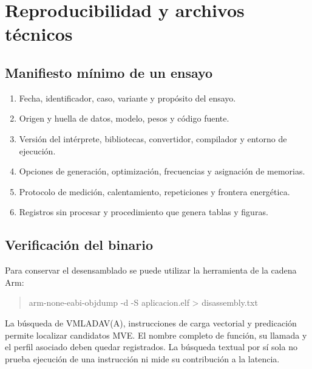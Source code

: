 \chapter{Reproducibilidad y archivos técnicos}
\section{Manifiesto mínimo de un ensayo}
\begin{enumerate}
\item Fecha, identificador, caso, variante y propósito del ensayo.
\item Origen y huella de datos, modelo, pesos y código fuente.
\item Versión del intérprete, bibliotecas, convertidor, compilador y entorno de ejecución.
\item Opciones de generación, optimización, frecuencias y asignación de memorias.
\item Protocolo de medición, calentamiento, repeticiones y frontera energética.
\item Registros sin procesar y procedimiento que genera tablas y figuras.
\end{enumerate}

\section{Verificación del binario}
Para conservar el desensamblado se puede utilizar la herramienta de la cadena Arm:
\begin{quote}\ttfamily\small
arm-none-eabi-objdump -d -S aplicacion.elf > disassembly.txt
\end{quote}
La búsqueda de VMLADAV(A), instrucciones de carga vectorial y predicación permite localizar candidatos MVE. El nombre completo de función, su llamada y el perfil asociado deben quedar registrados. La búsqueda textual por sí sola no prueba ejecución de una instrucción ni mide su contribución a la latencia.


